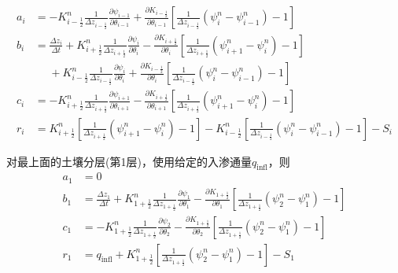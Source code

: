 \begin{equation}
  \begin{aligned}
    a_i &= - K_{i-\frac{1}{2}}^{n} \frac{1}{\Delta z_{i-\frac{1}{2}}}
    \frac{\partial \psi_{i-1}}{\partial \theta_{i-1}}+\frac{\partial K_{i-\frac{1}{2}}}
    {\partial \theta_{i-1}}\left[\frac{1}{\Delta z_{i-\frac{1}{2}}}\left(\psi_{i}^{n}-\psi_{i-1}^{n}\right)-1\right] \\
    b_i &= \frac{\Delta z_{i}}{\Delta t}+K_{i+\frac{1}{2}}^{n} \frac{1}{\Delta z_{i+\frac{1}{2}}}
    \frac{\partial \psi_{i}}{\partial \theta_{i}}-\frac{\partial K_{i+\frac{1}{2}}}{\partial \theta_{i}}
    \left[\frac{1}{\Delta z_{i+\frac{1}{2}}}\left(\psi_{i+1}^{n}-\psi_{i}^{n}\right)-1\right] \\
    &\mathrel{\phantom{=}}+K_{i-\frac{1}{2}}^{n} \frac{1}{\Delta z_{i-\frac{1}{2}}} \frac{\partial \psi_{i}}{\partial
    \theta_{i}}+\frac{\partial K_{i-\frac{1}{2}}}{\partial \theta_{i}}\left[\frac{1}{\Delta z_{i-\frac{1}{2}}}\left(\psi_{i}^{n}-\psi_{i-1}^{n}\right)-1\right] \\
    c_i &= - K_{i+\frac{1}{2}}^{n} \frac{1}{\Delta z_{i+\frac{1}{2}}}
    \frac{\partial \psi_{i+1}}{\partial \theta_{i+1}} - \frac{\partial K_{i+\frac{1}{2}}}{\partial \theta_{i+1}}\left[\frac{1}
    {\Delta z_{i+\frac{1}{2}}}\left(\psi_{i+1}^{n}-\psi_{i}^{n}\right)-1\right] \\
    r_i &= K_{i+\frac{1}{2}}^{n}
    \left[\frac{1}{\Delta z_{i+\frac{1}{2}}}\left(\psi_{i+1}^{n}-\psi_{i}^{n}\right)-1\right] - K_{i-\frac{1}{2}}^{n}
    \left[\frac{1}{\Delta z_{i-\frac{1}{2}}}\left(\psi_{i}^{n}-\psi_{i-1}^{n}\right)-1\right]-S_{i}
  \end{aligned}
\end{equation}

对最上面的土壤分层(第1层)，使用给定的入渗通量$q_{\mathrm{infl}}$，则
\begin{equation}
  \begin{aligned}
    a_1 &= 0 \\
    b_1 &= \frac{\Delta z_1}{\Delta t}+K_{1+\frac{1}{2}}^{n}
    \frac{1}{\Delta z_{1+\frac{1}{2}}} \frac{\partial \psi_{1}}{\partial \theta_{1}}-\frac{\partial K_{1+\frac{1}{2}}}{\partial \theta_{1}}\left[\frac{1}{\Delta z_{1+\frac{1}{2}}}
    \left(\psi_{2}^{n}-\psi_{1}^{n}\right)-1\right] \\
    c_1 &= -K_{1+\frac{1}{2}}^{n} \frac{1}{\Delta z_{1+\frac{1}{2}}}
    \frac{\partial \psi_{2}}{\partial \theta_{2}}-\frac{\partial K_{1+\frac{1}{2}}}{\partial \theta_{2}}\left[\frac{1}{\Delta z_{1+\frac{1}{2}}}
    \left(\psi_{2}^{n}-\psi_{1}^{n}\right)-1\right] \\
    r_1 &= q_{\mathrm{infl}}+K_{1+\frac{1}{2}}^{n}
    \left[\frac{1}{\Delta z_{1+\frac{1}{2}}}\left(\psi_{2}^{n}-\psi_{1}^{n}\right)-1\right]-S_{1}
  \end{aligned}
\end{equation}

